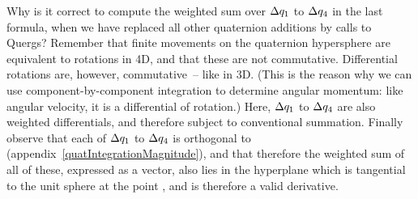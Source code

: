 Why is it correct to compute the weighted sum over $\Delta q_1$ to
$\Delta q_4$ in the last formula, when we have replaced all other quaternion additions
by calls to Quergs? Remember that finite movements on the quaternion hypersphere are
equivalent to rotations in 4D, and that these are not commutative. Differential
rotations are, however, commutative~-- like in 3D. (This is the reason why we can
use component-by-component integration to determine angular momentum:
like angular velocity, it is a differential of rotation.) Here, $\Delta q_1$ to
$\Delta q_4$ are also weighted differentials, and therefore subject to
conventional summation. Finally observe that each of $\Delta q_1$ to
$\Delta q_4$ is orthogonal to  (appendix~\ref{quatIntegrationMagnitude}),
and that therefore the weighted sum of all of these, expressed as a vector, also
lies in the hyperplane which is tangential to the unit sphere at the point ,
and is therefore a valid derivative.
